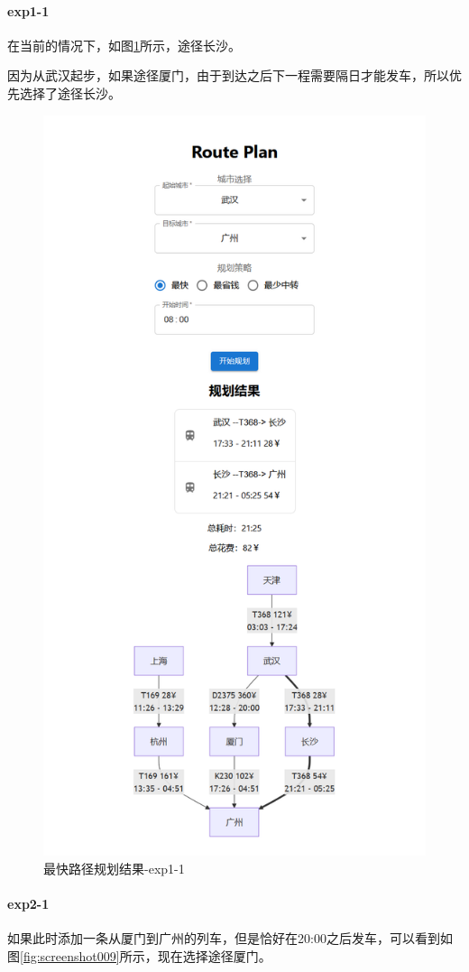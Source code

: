 \documentclass[10pt]{article}
\begin{document}
    \paragraph{exp1-1}
    在当前的情况下，如图\ref{fig:screenshot008}所示，途径长沙。

    因为从武汉起步，如果途径厦门，由于到达之后下一程需要隔日才能发车，所以优先选择了途径长沙。
    \begin{figure}
        \centering
        \includegraphics[width=0.7\linewidth]{img/screenshot008}
        \caption{最快路径规划结果-exp1-1}
        \label{fig:screenshot008}
    \end{figure}

    \paragraph{exp2-1}
    如果此时添加一条从厦门到广州的列车，但是恰好在20:00之后发车，可以看到如图\ref{fig:screenshot009}所示，现在选择途径厦门。
\end{document}
